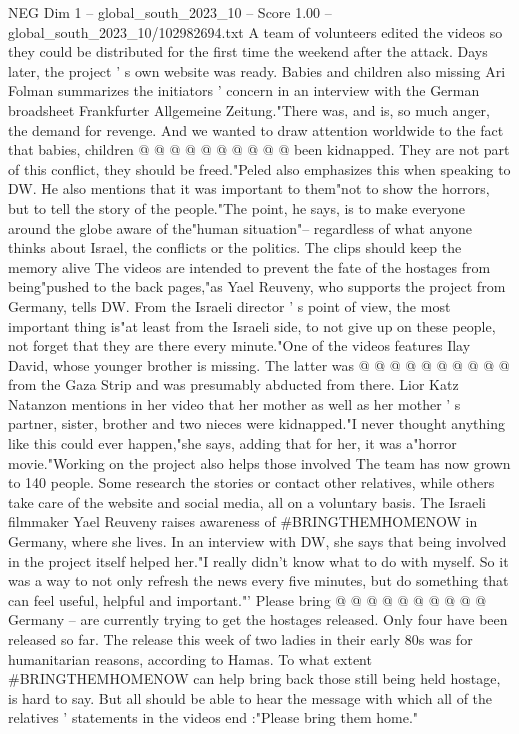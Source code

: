 \begin{textsample}{NEG Dim 1 – global\_south\_2023\_10 – Score 1.00 – global\_south\_2023\_10/102982694.txt}
A team of volunteers edited the videos so they could be distributed for the first time the weekend after the attack.
Days later, the project ' s own website was ready.
Babies and children also missing Ari Folman summarizes the initiators ' concern in an interview with the German broadsheet Frankfurter Allgemeine Zeitung."There was, and is, so much anger, the demand for revenge.
And we wanted to draw attention worldwide to the fact that babies, children @ @ @ @ @ @ @ @ @ @ been kidnapped.
They are not part of this conflict, they should be freed."Peled also emphasizes this when speaking to DW.
He also mentions that it was important to them"not to show the horrors, but to tell the story of the people."The point, he says, is to make everyone around the globe aware of the"human situation"-- regardless of what anyone thinks about Israel, the conflicts or the politics.
The clips should keep the memory alive The videos are intended to prevent the fate of the hostages from being"pushed to the back pages,"as Yael Reuveny, who supports the project from Germany, tells DW.
From the Israeli director ' s point of view, the most important thing is"at least from the Israeli side, to not give up on these people, not forget that they are there every minute."One of the videos features Ilay David, whose younger brother is missing.
The latter was @ @ @ @ @ @ @ @ @ @ from the Gaza Strip and was presumably abducted from there.
Lior Katz Natanzon mentions in her video that her mother as well as her mother ' s partner, sister, brother and two nieces were kidnapped."I never thought anything like this could ever happen,"she says, adding that for her, it was a"horror movie."Working on the project also helps those involved The team has now grown to 140 people.
Some research the stories or contact other relatives, while others take care of the website and social media, all on a voluntary basis.
The Israeli filmmaker Yael Reuveny raises awareness of \#BRINGTHEMHOMENOW in Germany, where she lives.
In an interview with DW, she says that being involved in the project itself helped her."I really didn't know what to do with myself.
So it was a way to not only refresh the news every five minutes, but do something that can feel useful, helpful and important."' Please bring @ @ @ @ @ @ @ @ @ @ Germany -- are currently trying to get the hostages released.
Only four have been released so far.
The release this week of two ladies in their early 80s was for humanitarian reasons, according to Hamas.
To what extent \#BRINGTHEMHOMENOW can help bring back those still being held hostage, is hard to say.
But all should be able to hear the message with which all of the relatives ' statements in the videos end :"Please bring them home."

\end{textsample}

